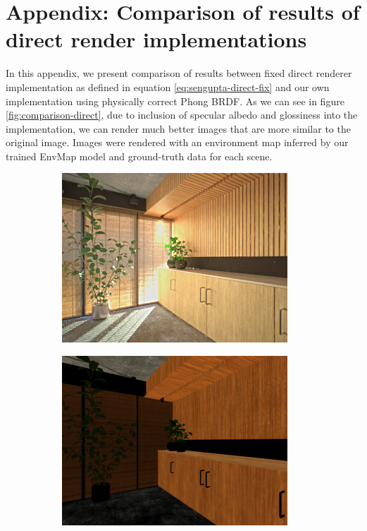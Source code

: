 \chapter*{Appendix: Comparison of results of direct render implementations}

In this appendix, we present comparison of results between fixed direct renderer \; implementation as defined in equation \ref{eq:sengupta-direct-fix} and our own implementation using physically correct Phong BRDF. As we can see in figure \ref{fig:comparison-direct}, due to inclusion of specular albedo and glossiness into the implementation, we can render much better images that are more similar to the original image. Images were rendered with an environment map inferred by our trained EnvMap model and ground-truth data for each scene.
\begin{figure}[H]
    \centering
    \begin{subfigure}{0.32\linewidth}
        \includegraphics[width=\linewidth]{praca/images/AI53_020_Cam09.png}
    \end{subfigure}
    \begin{subfigure}{0.32\linewidth}
        \includegraphics[width=\linewidth]{praca/images/AI53_020_Cam09.direct_sengputa.png}

\end{subfigure}
\end{figure}
